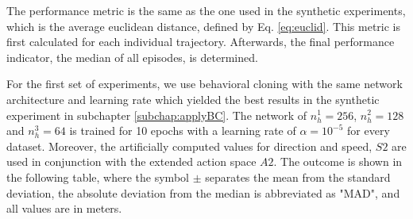 The performance metric is the same as the one used in the synthetic experiments, which is the average euclidean distance, defined by Eq.  \ref{eq:euclid}. This metric is first calculated for each individual trajectory. Afterwards, the final performance indicator, the median of all episodes, is determined.
\par
For the first set of experiments, we use behavioral cloning with the same network architecture and learning rate which yielded the best results in the synthetic experiment in subchapter \ref{subchap:applyBC}. The network of $n_h^1=256$, $n_h^2=128$ and $n_h^3=64$ is trained for 10 epochs with a learning rate of $\alpha=10^{-5}$ for every dataset. Moreover, the artificially computed values for direction and speed, $S2$ are used in conjunction with the extended action space $A2$. The outcome is shown in the following table, where the symbol $\pm$ separates the mean from the standard deviation, the absolute deviation from the median is abbreviated as "MAD", and all values are in meters.

